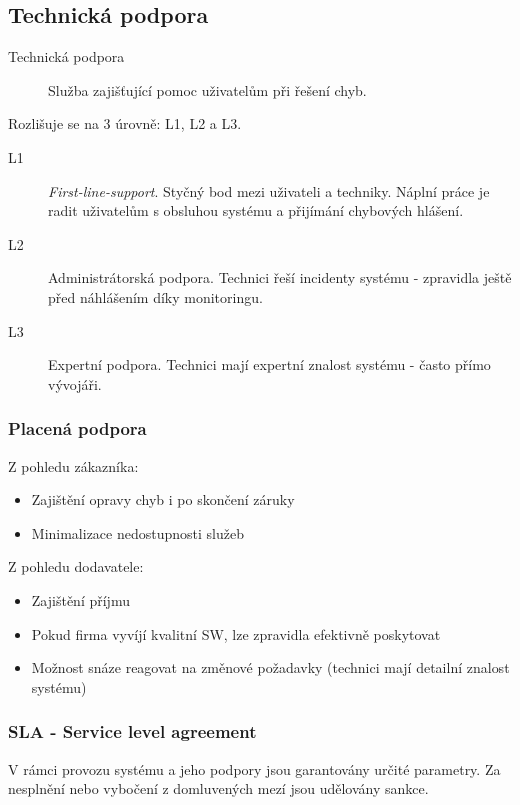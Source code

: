     \subsection{Technická podpora}
      \begin{description}
        \item[Technická podpora] Služba zajišťující pomoc uživatelům při řešení chyb.
      \end{description}

      Rozlišuje se na 3 úrovně: L1, L2 a L3.

      \begin{description}
        \item[L1] \emph{First-line-support}. Styčný bod mezi uživateli a techniky. Náplní práce je radit uživatelům s obsluhou systému a přijímání chybových hlášení.
        \item[L2] Administrátorská podpora. Technici řeší incidenty systému - zpravidla ještě před náhlášením díky monitoringu.
        \item[L3] Expertní podpora. Technici mají expertní znalost systému - často přímo vývojáři.
      \end{description}

      \subsubsection{Placená podpora}
        Z pohledu zákazníka:
        \begin{itemize}
          \item Zajištění opravy chyb i po skončení záruky
          \item Minimalizace nedostupnosti služeb
        \end{itemize}

        Z pohledu dodavatele:
        \begin{itemize}
          \item Zajištění příjmu
          \item Pokud firma vyvíjí kvalitní SW, lze zpravidla efektivně poskytovat
          \item Možnost snáze reagovat na změnové požadavky (technici mají detailní znalost systému)
        \end{itemize}

      \subsubsection{SLA - Service level agreement}
        V rámci provozu systému a jeho podpory jsou garantovány určité parametry.
        Za nesplnění nebo vybočení z domluvených mezí jsou udělovány sankce.

